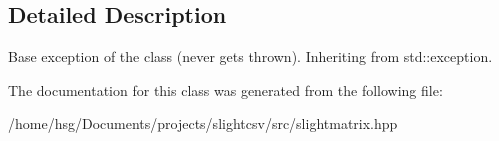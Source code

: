 \subsection{Detailed Description}
Base exception of the class (never gets thrown). Inheriting from std\+::exception. 

The documentation for this class was generated from the following file\+:\begin{DoxyCompactItemize}
\item 
/home/hsg/\+Documents/projects/slightcsv/src/slightmatrix.\+hpp\end{DoxyCompactItemize}
